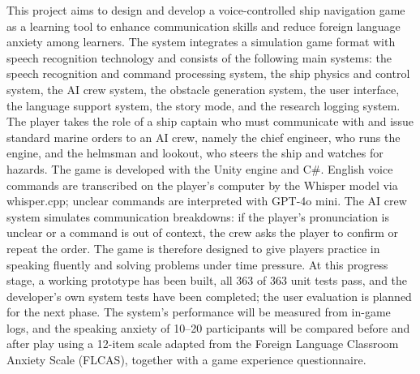 This project aims to design and develop a voice-controlled ship navigation game as a learning tool to enhance communication skills and reduce foreign language anxiety among learners. The system integrates a simulation game format with speech recognition technology and consists of the following main systems: the speech recognition and command processing system, the ship physics and control system, the AI crew system, the obstacle generation system, the user interface, the language support system, the story mode, and the research logging system. The player takes the role of a ship captain who must communicate with and issue standard marine orders to an AI crew, namely the chief engineer, who runs the engine, and the helmsman and lookout, who steers the ship and watches for hazards. The game is developed with the Unity engine and C\#. English voice commands are transcribed on the player's computer by the Whisper model via whisper.cpp; unclear commands are interpreted with GPT-4o mini. The AI crew system simulates communication breakdowns: if the player's pronunciation is unclear or a command is out of context, the crew asks the player to confirm or repeat the order. The game is therefore designed to give players practice in speaking fluently and solving problems under time pressure. At this progress stage, a working prototype has been built, all 363 of 363 unit tests pass, and the developer's own system tests have been completed; the user evaluation is planned for the next phase. The system's performance will be measured from in-game logs, and the speaking anxiety of 10--20 participants will be compared before and after play using a 12-item scale adapted from the Foreign Language Classroom Anxiety Scale (FLCAS), together with a game experience questionnaire.
